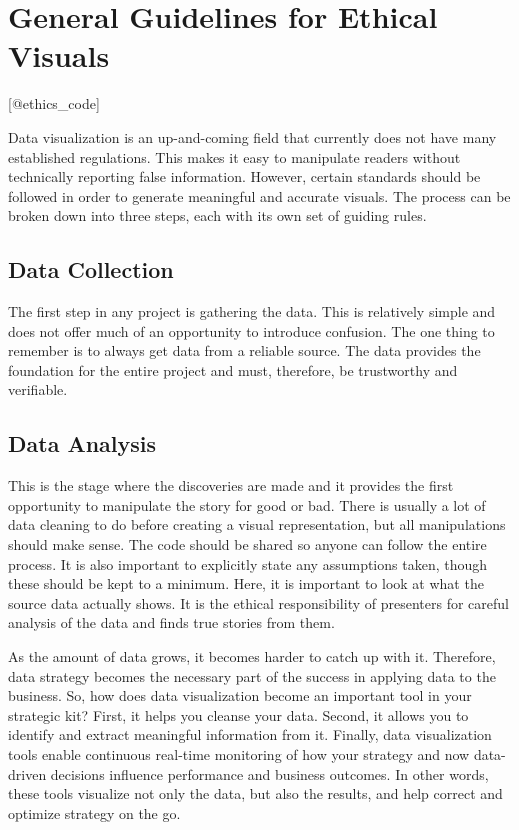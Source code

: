 \documentclass[]{book}
\theoremstyle{definition}
\theoremstyle{definition}
\theoremstyle{definition}
\theoremstyle{remark}
\begin{document}
\section{General Guidelines for Ethical
Visuals}\label{general-guidelines-for-ethical-visuals}

{[}@ethics\_code{]}

Data visualization is an up-and-coming field that currently does not
have many established regulations. This makes it easy to manipulate
readers without technically reporting false information. However,
certain standards should be followed in order to generate meaningful and
accurate visuals. The process can be broken down into three steps, each
with its own set of guiding rules.

\subsection{Data Collection}\label{data-collection}

The first step in any project is gathering the data. This is relatively
simple and does not offer much of an opportunity to introduce confusion.
The one thing to remember is to always get data from a reliable source.
The data provides the foundation for the entire project and must,
therefore, be trustworthy and verifiable.

\subsection{Data Analysis}\label{data-analysis}

This is the stage where the discoveries are made and it provides the
first opportunity to manipulate the story for good or bad. There is
usually a lot of data cleaning to do before creating a visual
representation, but all manipulations should make sense. The code should
be shared so anyone can follow the entire process. It is also important
to explicitly state any assumptions taken, though these should be kept
to a minimum. Here, it is important to look at what the source data
actually shows. It is the ethical responsibility of presenters for
careful analysis of the data and finds true stories from them.

As the amount of data grows, it becomes harder to catch up with it.
Therefore, data strategy becomes the necessary part of the success in
applying data to the business. So, how does data visualization become an
important tool in your strategic kit? First, it helps you cleanse your
data. Second, it allows you to identify and extract meaningful
information from it. Finally, data visualization tools enable continuous
real-time monitoring of how your strategy and now data-driven decisions
influence performance and business outcomes. In other words, these tools
visualize not only the data, but also the results, and help correct and
optimize strategy on the go.
\end{document}
